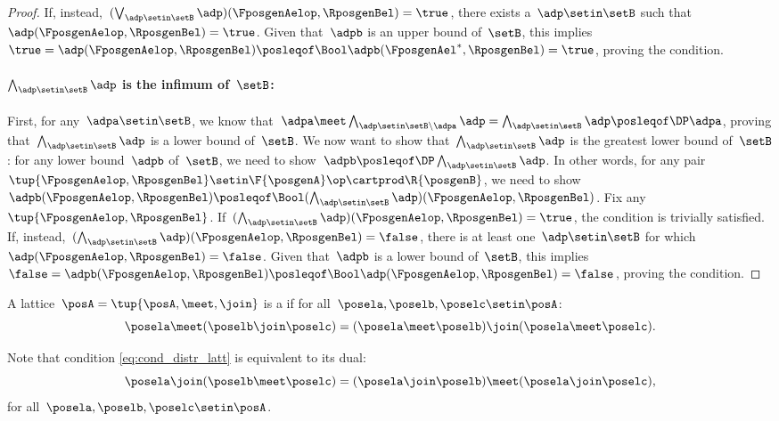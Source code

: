 \begin{proof}
    If, instead,~$(\bigvee_{\adp \setin \setB} \adp)(\FposgenAelop,\RposgenBel)=\true$, there exists a~$\adp\setin \setB$ such that~$\adp(\FposgenAelop,\RposgenBel)=\true$.
    Given that~$\adpb$ is an upper bound of~$\setB$, this implies~$\true=\adp(\FposgenAelop,\RposgenBel)\posleqof\Bool \adpb(\FposgenAel^*,\RposgenBel)=\true$, proving the condition.

    \paragraph*{$\bigwedge_{\adp \setin \setB} \adp$ is the infimum of~$\setB$:}
    First, for any~$\adpa\setin \setB$, we know that~$\adpa \meet \bigwedge_{\adp \setin \setB \backslash \adpa} \adp= \bigwedge_{\adp \setin \setB} \adp \posleqof\DP \adpa$, proving that~$\bigwedge_{\adp \setin \setB} \adp$ is a lower bound of~$\setB$.
    We now want to show that~$\bigwedge_{\adp \setin \setB} \adp$ is the greatest lower bound of~$\setB$: for any lower bound~$\adpb$ of~$\setB$, we need to show~$\adpb\posleqof\DP\bigwedge_{\adp \setin \setB} \adp $.
    In other words, for any pair~$\tup{\FposgenAelop,\RposgenBel}\setin \F{\posgenA}\op\cartprod \R{\posgenB}$, we need to show~$\adpb(\FposgenAelop,\RposgenBel) \posleqof\Bool (\bigwedge_{\adp \setin \setB} \adp)(\FposgenAelop,\RposgenBel)$.
    Fix any~$\tup{\FposgenAelop,\RposgenBel}$.
    If~$(\bigwedge_{\adp \setin \setB} \adp)(\FposgenAelop,\RposgenBel)=\true$, the condition is trivially satisfied.
    If, instead,~$(\bigwedge_{\adp \setin \setB} \adp)(\FposgenAelop,\RposgenBel)=\false$, there is at least one~$\adp\setin \setB$ for which~$\adp(\FposgenAelop,\RposgenBel)=\false$.
    Given that~$\adpb$ is a lower bound of~$\setB$, this implies~$\false=\adpb(\FposgenAelop,\RposgenBel)\posleqof\Bool \adp(\FposgenAelop,\RposgenBel)=\false$, proving the condition.
\end{proof}

\begin{definition}
    \label{def:distributive-lattice}
    A lattice~$\posA=\tup{\posA,\meet, \join}$ is a \emph{} if for all~$\posela,\poselb,\poselc\setin \posA$:
    \begin{equation}
        \label{eq:cond_distr_latt}
        \posela \meet (\poselb \join \poselc)=(\posela \meet \poselb)\join (\posela \meet \poselc).
    \end{equation}
\end{definition}
\begin{remark}
    Note that condition \cref{eq:cond_distr_latt} is equivalent to its dual:
    \begin{equation}
        \posela \join (\poselb\meet \poselc)=(\posela \join \poselb)\meet (\posela\join \poselc),
    \end{equation}
    for all~$\posela,\poselb,\poselc\setin \posA$.
\end{remark}

